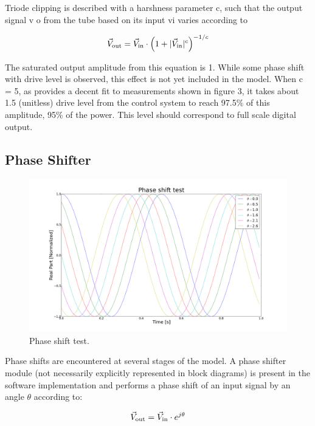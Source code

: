 \documentclass[a4paper,12pt]{article}
\begin{document}
Triode clipping is described with a harshness parameter c, such that the output signal v o from the tube based on its input vi varies according to

\begin{equation}
  \vec V_{\rm out} = \vec V_{\rm in} \cdot \left(1 + |\vec V_{\rm in}|^c\right)^{-1/c}
\end{equation}

The saturated output amplitude from this equation is 1. While some phase shift with drive level is observed, this effect is not yet included in the model. When c = 5, as provides a decent fit to measurements shown in figure 3, it takes about 1.5 (unitless) drive level from the control system to reach 97.5\% of this amplitude, 95\% of the power. This level should correspond to full scale digital output.

\subsection{Phase Shifter}

\begin{figure}
\centering
\includegraphics[scale=0.265]{../figures/phase_shift_test.png}
\caption{Phase shift test.}
\label{fig:phase_shfiter_test}
\end{figure}

Phase shifts are encountered at several stages of the model. A phase shifter module (not necessarily explicitly represented in block diagrams) is present in the software implementation and performs a phase shift of an input signal by an angle $\theta$ according to:

\begin{equation}
  \vec V_{\rm out} = \vec V_{\rm in} \cdot e^{j\theta}
\end{equation}
\end{document}
